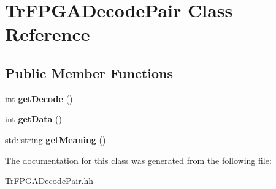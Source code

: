 \hypertarget{classTrFPGADecodePair}{\section{Tr\-F\-P\-G\-A\-Decode\-Pair Class Reference}
\label{classTrFPGADecodePair}
}
\subsection*{Public Member Functions}
\begin{DoxyCompactItemize}
\item 
\hypertarget{classTrFPGADecodePair_a2a1be9f6a91a32a816d39a63ba8e576d}{int {\bfseries get\-Decode} ()}\label{classTrFPGADecodePair_a2a1be9f6a91a32a816d39a63ba8e576d}

\item 
\hypertarget{classTrFPGADecodePair_aa4945df4a5345c064bbc5e852769c8bb}{int {\bfseries get\-Data} ()}\label{classTrFPGADecodePair_aa4945df4a5345c064bbc5e852769c8bb}

\item 
\hypertarget{classTrFPGADecodePair_a42887abba115f0d77ca71dde3935619e}{std\-::string {\bfseries get\-Meaning} ()}\label{classTrFPGADecodePair_a42887abba115f0d77ca71dde3935619e}

\end{DoxyCompactItemize}


The documentation for this class was generated from the following file\-:\begin{DoxyCompactItemize}
\item 
Tr\-F\-P\-G\-A\-Decode\-Pair.\-hh\end{DoxyCompactItemize}
